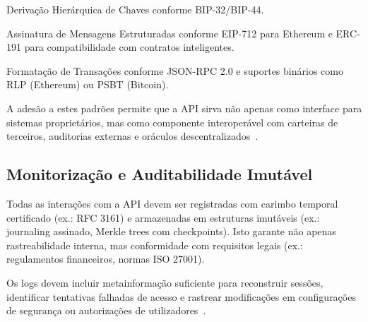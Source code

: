 Derivação Hierárquica de Chaves conforme BIP-32/BIP-44.

Assinatura de Mensagens Estruturadas conforme EIP-712 para Ethereum e ERC-191 para compatibilidade com contratos inteligentes.

Formatação de Transações conforme JSON-RPC 2.0 e suportes binários como RLP (Ethereum) ou PSBT (Bitcoin).

A adesão a estes padrões permite que a API sirva não apenas como interface para sistemas proprietários, mas como componente interoperável com carteiras de terceiros, auditorias externas e oráculos descentralizados~\cite{ethereumEIP712, wood2021}.

\subsection{Monitorização e Auditabilidade Imutável}
Todas as interações com a API devem ser registradas com carimbo temporal certificado (ex.: RFC 3161) e armazenadas em estruturas imutáveis (ex.: journaling assinado, Merkle trees com checkpoints). Isto garante não apenas rastreabilidade interna, mas conformidade com requisitos legais (ex.: regulamentos financeiros, normas ISO 27001).

Os logs devem incluir metainformação suficiente para reconstruir sessões, identificar tentativas falhadas de acesso e rastrear modificações em configurações de segurança ou autorizações de utilizadores~\cite{nist800-92}.


